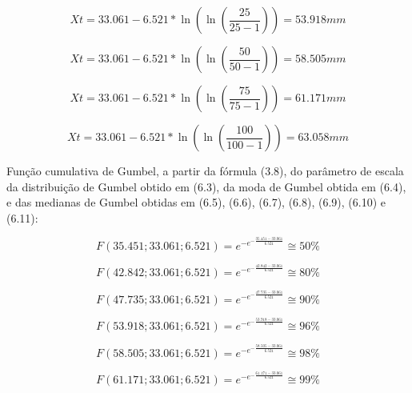 \begin{equation}
Xt = 33.061 - 6.521 * \ln{\left(\ln{\left(\frac{25}{25 - 1}\right)}\right)} = 53.918 mm
\end{equation}

\begin{equation}
Xt = 33.061 - 6.521 * \ln{\left(\ln{\left(\frac{50}{50 - 1}\right)}\right)} = 58.505 mm
\end{equation}

\begin{equation}
Xt = 33.061 - 6.521 * \ln{\left(\ln{\left(\frac{75}{75 - 1}\right)}\right)} = 61.171 mm
\end{equation}

\begin{equation}
Xt = 33.061 - 6.521 * \ln{\left(\ln{\left(\frac{100}{100 - 1}\right)}\right)} = 63.058 mm
\end{equation}

\newpage

Função cumulativa de Gumbel, a partir da fórmula (3.8), do parâmetro de escala da distribuição de Gumbel obtido em (6.3), da moda de Gumbel obtida em (6.4), e das medianas de Gumbel obtidas em (6.5), (6.6), (6.7), (6.8), (6.9), (6.10) e (6.11):\bigskip

\begin{equation}
F(35.451; 33.061; 6.521) = e^{- e^{- \frac{35.451 - 33.061}{6.521}}} \cong 50\% 
\end{equation}

\begin{equation}
F(42.842; 33.061; 6.521) = e^{- e^{- \frac{42.842 - 33.061}{6.521}}} \cong 80\% 
\end{equation}

\begin{equation}
F(47.735; 33.061; 6.521) = e^{- e^{- \frac{47.735 - 33.061}{6.521}}} \cong 90\% 
\end{equation}

\begin{equation}
F(53.918; 33.061; 6.521) = e^{- e^{- \frac{53.918 - 33.061}{6.521}}} \cong 96\% 
\end{equation}

\begin{equation}
F(58.505; 33.061; 6.521) = e^{- e^{- \frac{58.505 - 33.061}{6.521}}} \cong 98\% 
\end{equation}

\begin{equation}
F(61.171; 33.061; 6.521) = e^{- e^{- \frac{61.171 - 33.061}{6.521}}} \cong 99\% 
\end{equation}

